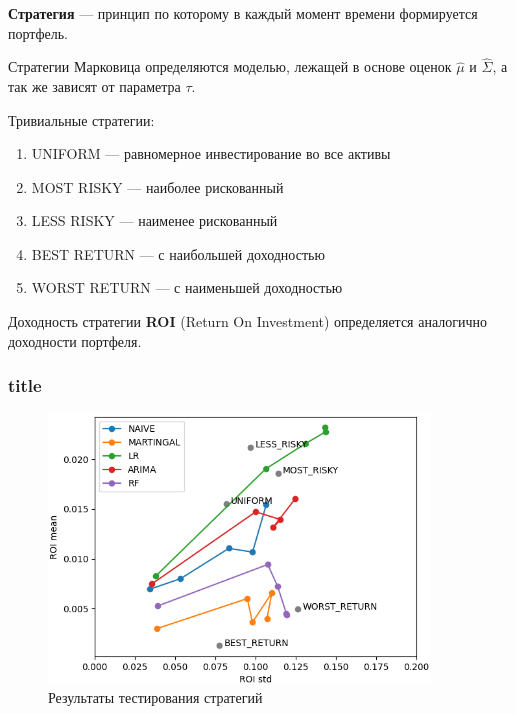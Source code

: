 \documentclass{beamer}
\begin{document}
\begin{frame}
    \frametitle{}
    \textbf{Стратегия} --- принцип по которому в каждый момент времени формируется портфель.

    Стратегии Марковица определяются моделью, лежащей в основе оценок $\hat{\mu}$ и $\hat{\Sigma}$,
    а так же зависят от параметра $\tau$.
    
    Тривиальные стратегии:
    \begin{enumerate}
        \item UNIFORM --- равномерное инвестирование во все активы
        \item MOST RISKY --- наиболее рискованный
        \item LESS RISKY --- наименее рискованный
        \item BEST RETURN --- с наибольшей доходностью
        \item WORST RETURN --- с наименьшей доходностью
    \end{enumerate}

    Доходность стратегии \textbf{ROI} (Return On Investment) определяется аналогично доходности портфеля.
\end{frame} 

\begin{frame}
    \frametitle{title}
    \begin{figure}
        \centering
        \includegraphics[width=0.9\textwidth]{result_frontiers_cut.png}
        \caption{Результаты тестирования стратегий}
        \label{fig:result_frontier}
    \end{figure}
\end{frame}
\end{document}
